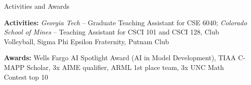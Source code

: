 \documentclass{resume} %
\begin{document}
\begin{rSection}{Activities and Awards} 

\textbf{Activities:} \textit{Georgia Tech} -- Graduate Teaching Assistant for CSE 6040; \textit{Colorado School of Mines} -- Teaching Assistant for CSCI 101 and CSCI 128, Club Volleyball, Sigma Phi Epsilon Fraternity, Putnam Club
\vspace{-4pt}

\textbf{Awards:} Wells Fargo AI Spotlight Award (AI in Model Development), TIAA C-MAPP Scholar, 3x AIME qualifier, ARML 1st place team, 3x UNC Math Contest top 10
\vspace{-4pt}


\vspace{-4pt}

\end{rSection}
\end{document}
